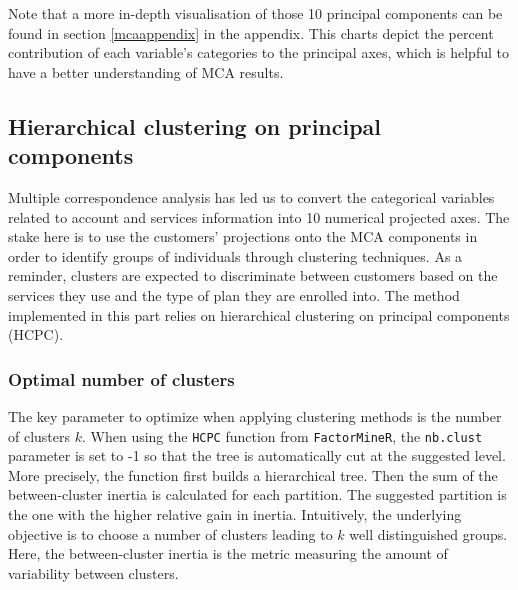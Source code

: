 \documentclass[
]{book}
\begin{document}
Note that a more in-depth visualisation of those 10 principal components can be found in section \ref{mcaappendix} in the appendix. This charts depict the percent contribution of each variable's categories to the principal axes, which is helpful to have a better understanding of MCA results.

\hypertarget{hierarchical-clustering-on-principal-components}{%
\subsection{Hierarchical clustering on principal components}\label{hierarchical-clustering-on-principal-components}}

Multiple correspondence analysis has led us to convert the categorical variables related to account and services information into 10 numerical projected axes. The stake here is to use the customers' projections onto the MCA components in order to identify groups of individuals through clustering techniques. As a reminder, clusters are expected to discriminate between customers based on the services they use and the type of plan they are enrolled into. The method implemented in this part relies on hierarchical clustering on principal components (HCPC).

\hypertarget{optimal-number-of-clusters}{%
\subsubsection*{Optimal number of clusters}\label{optimal-number-of-clusters}}

The key parameter to optimize when applying clustering methods is the number of clusters \(k\). When using the \texttt{HCPC} function from \texttt{FactorMineR}, the \texttt{nb.clust} parameter is set to -1 so that the tree is automatically cut at the suggested level. More precisely, the function first builds a hierarchical tree. Then the sum of the between-cluster inertia is calculated for each partition. The suggested partition is the one with the higher relative gain in inertia. Intuitively, the underlying objective is to choose a number of clusters leading to \(k\) well distinguished groups. Here, the between-cluster inertia is the metric measuring the amount of variability between clusters.
\end{document}
